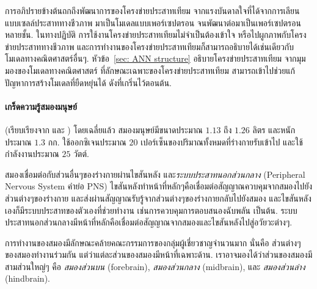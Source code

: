 การอภิปรายข้างต้นถกถึงพัฒนาการของโครงข่ายประสาทเทียม
จากแรงบันดาลใจที่ได้จากการเลียนแบบเซลล์ประสาททางชีวภาพ 
มาเป็นโมเดลแบบเพอร์เซปตรอน 
จนพัฒนาต่อมาเป็นเพอร์เซปตรอนหลายชั้น.
ในทางปฏิบัติ การใช้งานโครงข่ายประสาทเทียมไม่จำเป็นต้องเข้าใจ หรือไปผูกภาพกับโครงข่ายประสาททางชีวภาพ
และการทำงานของโครงข่ายประสาทเทียมก็สามารถอธิบายได้เช่นเดียวกับโมเดลทางคณิตศาสตร์อื่นๆ.
หัวข้อ~\ref{sec: ANN structure} อธิบายโครงข่ายประสาทเทียม จากมุมมองของโมเดลทางคณิตศาสตร์
ที่ลักษณะเฉพาะของโครงข่ายประสาทเทียม สามารถเข้าไปช่วยแก้ปัญหาการสร้างโมเดลที่ยืดหยุ่นได้ ดังที่เกริ่นไว้ตอนต้น.

{\small
\begin{shaded}
\paragraph{\small เกร็ดความรู้สมองมนุษย์}
(เรียบเรียงจาก \cite{NIND} \cite{BuddhasBrain} และ \cite{Wikipedia})
โดยเฉลี่ยแล้ว สมองมนุษย์มีขนาดประมาณ $1.13$ ถึง $1.26$ ลิตร และหนักประมาณ $1.3$ กก.
ใช้ออกซิเจนประมาณ $20$ เปอร์เซ็นของปริมาณทั้งหมดที่ร่างกายรับเข้าไป
และใช้กำลังงานประมาณ $25$ วัตต์\cite{GodwinCham2012a}.
%

สมองเชื่อมต่อกับส่วนอื่นๆของร่างกายผ่านไขสันหลัง 
และ\textit{ระบบประสาทนอกส่วนกลาง} (Peripheral Nervous System คำย่อ PNS) 
%
ไขสันหลังทำหน้าที่หลักๆคือเชื่อมต่อสัญญาณควบคุมจากสมองไปยังส่วนต่างๆของร่างกาย และส่งผ่านสัญญาณรับรู้จากส่วนต่างๆของร่างกายกลับไปยังสมอง
และไขสันหลังเองก็มีระบบประสาทของตัวเองที่ช่วยทำงาน เช่นการควบคุมการตอบสนองฉับพลัน เป็นต้น.
ระบบประสาทนอกส่วนกลางมีหน้าที่หลักคือเชื่อมต่อสัญญาณจากสมองและไขสันหลังไปสู่อวัยวะต่างๆ.
%

การทำงานของสมองมีลักษณะคล้ายคณะกรรมการของกลุ่มผู้เชี่ยวชาญจำนวนมาก
นั่นคือ ส่วนต่างๆของสมองทำงานร่วมกัน แต่ว่าแต่ละส่วนของสมองมีหน้าที่เฉพาะด้าน.
เราอาจมองได้ว่าส่วนของสมองมีสามส่วนใหญ่ๆ คือ \textit{สมองส่วนบน} (forebrain), \textit{สมองส่วนกลาง} (midbrain), และ \textit{สมองส่วนล่าง} (hindbrain).


\end{shaded}}
